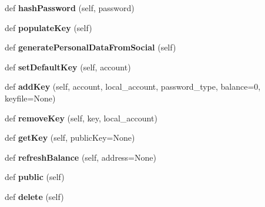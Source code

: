 \begin{DoxyCompactItemize}
\item 
\mbox{\label{classapp_1_1models_1_1user_1_1_user_document_a02694f20b7700bad4518c8f28d5367da}} 
def {\bfseries hash\+Password} (self, password)
\item 
\mbox{\label{classapp_1_1models_1_1user_1_1_user_document_a121068df75e026414f5287c13abc3005}} 
def {\bfseries populate\+Key} (self)
\item 
\mbox{\label{classapp_1_1models_1_1user_1_1_user_document_a15eefba3d69de49f4313cfe99a3d5d37}} 
def {\bfseries generate\+Personal\+Data\+From\+Social} (self)
\item 
\mbox{\label{classapp_1_1models_1_1user_1_1_user_document_ae9e3e982f0587e488df8e6ccdf63e9f4}} 
def {\bfseries set\+Default\+Key} (self, account)
\item 
\mbox{\label{classapp_1_1models_1_1user_1_1_user_document_a7c28aacd486d8fbfade235902aaae6a4}} 
def {\bfseries add\+Key} (self, account, local\+\_\+account, password\+\_\+type, balance=0, keyfile=None)
\item 
\mbox{\label{classapp_1_1models_1_1user_1_1_user_document_a3147297e844495cd1b330f7673c2667c}} 
def {\bfseries remove\+Key} (self, key, local\+\_\+account)
\item 
\mbox{\label{classapp_1_1models_1_1user_1_1_user_document_a99e127073d7be6927bca921315aa7040}} 
def {\bfseries get\+Key} (self, public\+Key=None)
\item 
\mbox{\label{classapp_1_1models_1_1user_1_1_user_document_add3f3a6450387e8e0478b0a95a731506}} 
def {\bfseries refresh\+Balance} (self, address=None)
\item 
\mbox{\label{classapp_1_1models_1_1user_1_1_user_document_a59a2d435a47269cff17ee0aedeffdea8}} 
def {\bfseries public} (self)
\item 
\mbox{\label{classapp_1_1models_1_1user_1_1_user_document_ac909ba1dbda44c6f41e3f0a4153b088b}} 
def {\bfseries delete} (self)
\end{DoxyCompactItemize}
